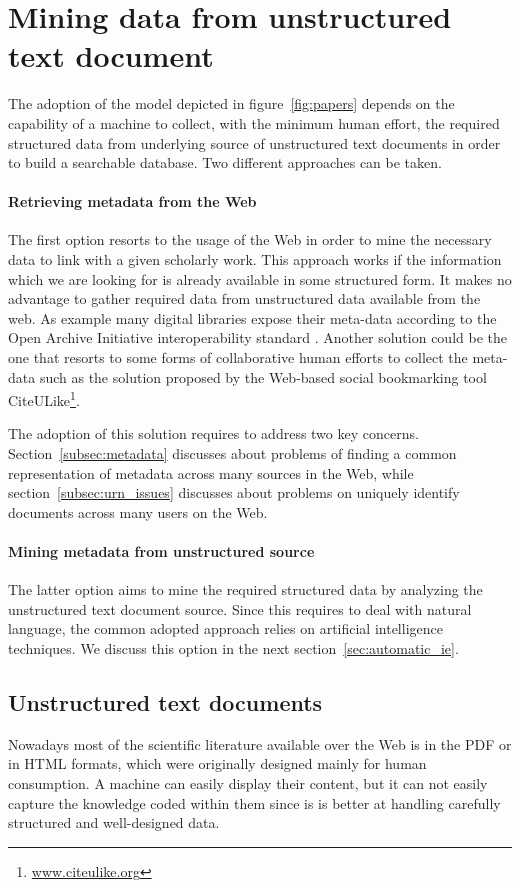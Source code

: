 \section{\label{sec:building_models}Mining data from unstructured text document}
The adoption of the model depicted in figure~\ref{fig:papers} depends on the capability of a machine to collect, with the minimum human effort, the required structured data from underlying source of unstructured text documents in order to build a searchable database. Two different approaches can be taken.

\paragraph{Retrieving metadata from the Web} The first option resorts to the usage of the Web in order to mine the necessary data to link with a given scholarly work. This approach works if the information which we are looking for is already available in some structured form. It makes no advantage to gather required data from unstructured data available from the web. As example many digital libraries expose their meta-data according to the Open Archive Initiative interoperability standard \cite{LSH01}. Another solution could be the one that resorts to some forms of collaborative human efforts to collect the meta-data such as the solution proposed by the Web-based social bookmarking tool CiteULike\footnote{\url{www.citeulike.org}}.

The adoption of this solution requires to address two key concerns. Section~\ref{subsec:metadata} discusses about problems of finding a common representation of metadata across many sources in the Web, while section~\ref{subsec:urn_issues} discusses about problems on uniquely identify documents across many users on the Web.

\paragraph{Mining metadata from unstructured source} The latter option aims to mine the required structured data by analyzing the unstructured text document source. Since this requires to deal with natural language, the common adopted approach relies on artificial intelligence techniques. We discuss this option in the next section~\ref{sec:automatic_ie}.

\subsection{\label{subsec:mining_data}Unstructured text documents}
Nowadays most of the scientific literature available over the Web is in the \textsc{PDF} or in \textsc{HTML} formats, which were originally designed mainly for human consumption. A machine can easily display their content, but it can not easily capture the knowledge coded within them since is is better at handling carefully structured and well-designed data.

